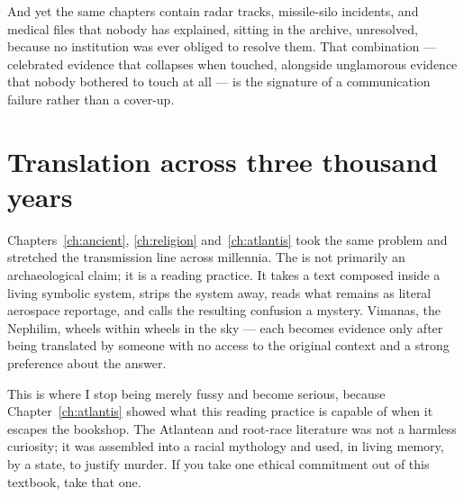 And yet the same chapters contain radar tracks, missile-silo incidents, and
medical files that nobody has explained, sitting in the archive, unresolved,
because no institution was ever obliged to resolve them. That combination ---
celebrated evidence that collapses when touched, alongside unglamorous evidence
that nobody bothered to touch at all --- is the signature of a communication
failure rather than a cover-up. 

\section*{Translation across three thousand years}

Chapters~\ref{ch:ancient}, \ref{ch:religion} and~\ref{ch:atlantis} took the same
problem and stretched the transmission line across millennia. The
 is not primarily an archaeological claim; it is a
reading practice. It takes a text composed inside a living symbolic system, strips
the system away, reads what remains as literal aerospace reportage, and calls the
resulting confusion a mystery. Vimanas, the Nephilim, wheels within wheels in the
sky --- each becomes evidence only after being translated by someone with no
access to the original context and a strong preference about the answer.

This is where I stop being merely fussy and become serious, because
Chapter~\ref{ch:atlantis} showed what this reading practice is capable of when it
escapes the bookshop. The Atlantean and root-race literature was not a harmless
curiosity; it was assembled into a racial mythology and used, in living memory, by
a state, to justify murder.  If you take one ethical commitment out of this textbook, take that one.

